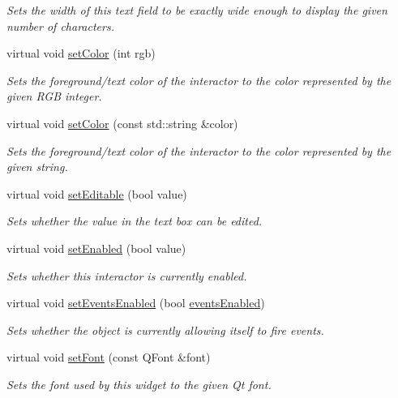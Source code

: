 \begin{DoxyCompactItemize}
\begin{DoxyCompactList}\small\item\em Sets the width of this text field to be exactly wide enough to display the given number of characters. \end{DoxyCompactList}\item 
virtual void \mbox{\hyperlink{classGInteractor_ab1f5cc0f5cc6bbbd716a526c61f1081d}{set\+Color}} (int rgb)
\begin{DoxyCompactList}\small\item\em Sets the foreground/text color of the interactor to the color represented by the given R\+GB integer. \end{DoxyCompactList}\item 
virtual void \mbox{\hyperlink{classGInteractor_a61374df6c11b52cfbb0815decdbaebc6}{set\+Color}} (const std\+::string \&color)
\begin{DoxyCompactList}\small\item\em Sets the foreground/text color of the interactor to the color represented by the given string. \end{DoxyCompactList}\item 
virtual void \mbox{\hyperlink{classGTextField_a008d7fd44fb3e7a6886cdaddbc3644a2}{set\+Editable}} (bool value)
\begin{DoxyCompactList}\small\item\em Sets whether the value in the text box can be edited. \end{DoxyCompactList}\item 
virtual void \mbox{\hyperlink{classGInteractor_ab831367dd84bbd579e02e55bacb21343}{set\+Enabled}} (bool value)
\begin{DoxyCompactList}\small\item\em Sets whether this interactor is currently enabled. \end{DoxyCompactList}\item 
virtual void \mbox{\hyperlink{classGObservable_afaa30b2a9e0f378fd1c70d2f1d0b8216}{set\+Events\+Enabled}} (bool \mbox{\hyperlink{classGInteractor_ac05ba5b92e2e5146d416fe7f842a0969}{events\+Enabled}})
\begin{DoxyCompactList}\small\item\em Sets whether the object is currently allowing itself to fire events. \end{DoxyCompactList}\item 
virtual void \mbox{\hyperlink{classGInteractor_a2592348886ffea646c6534bf88f7c49d}{set\+Font}} (const Q\+Font \&font)
\begin{DoxyCompactList}\small\item\em Sets the font used by this widget to the given Qt font. \end{DoxyCompactList}\item 

\end{DoxyCompactItemize}
